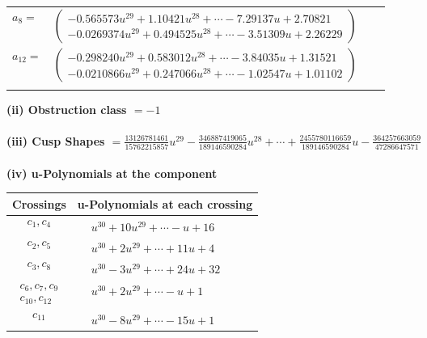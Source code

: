 \documentclass[1p]{elsarticle_modified}
\theoremstyle{definition}
\begin{document}
\begin{tabular}{m{7pt} m{180pt} m{7pt} m{180pt} }
\flushright $a_{8}=$&$\begin{pmatrix}-0.565573 u^{29}+1.10421 u^{28}+\cdots-7.29137 u+2.70821\\-0.0269374 u^{29}+0.494525 u^{28}+\cdots-3.51309 u+2.26229\end{pmatrix}$ \\
\flushright $a_{12}=$&$\begin{pmatrix}-0.298240 u^{29}+0.583012 u^{28}+\cdots-3.84035 u+1.31521\\-0.0210866 u^{29}+0.247066 u^{28}+\cdots-1.02547 u+1.01102\end{pmatrix}$\\&\end{tabular}
\flushleft \textbf{(ii) Obstruction class $= -1$}\\~\\
\flushleft \textbf{(iii) Cusp Shapes $= \frac{13126781461}{15762215857} u^{29}-\frac{346887419065}{189146590284} u^{28}+\cdots+\frac{2455780116659}{189146590284} u-\frac{364257663059}{47286647571}$}\\~\\
\newpage\renewcommand{\arraystretch}{1}
\flushleft \textbf{(iv) u-Polynomials at the component}\newline \\
\begin{tabular}{m{50pt}|m{274pt}}
Crossings & \hspace{64pt}u-Polynomials at each crossing \\
\hline $$\begin{aligned}c_{1},c_{4}\end{aligned}$$&$\begin{aligned}
&u^{30}+10 u^{29}+\cdots- u+16
\end{aligned}$\\
\hline $$\begin{aligned}c_{2},c_{5}\end{aligned}$$&$\begin{aligned}
&u^{30}+2 u^{29}+\cdots+11 u+4
\end{aligned}$\\
\hline $$\begin{aligned}c_{3},c_{8}\end{aligned}$$&$\begin{aligned}
&u^{30}-3 u^{29}+\cdots+24 u+32
\end{aligned}$\\
\hline $$\begin{aligned}c_{6},c_{7},c_{9}\\c_{10},c_{12}\end{aligned}$$&$\begin{aligned}
&u^{30}+2 u^{29}+\cdots- u+1
\end{aligned}$\\
\hline $$\begin{aligned}c_{11}\end{aligned}$$&$\begin{aligned}
&u^{30}-8 u^{29}+\cdots-15 u+1
\end{aligned}$\\
\hline
\end{tabular}\\~\\
\end{document}
